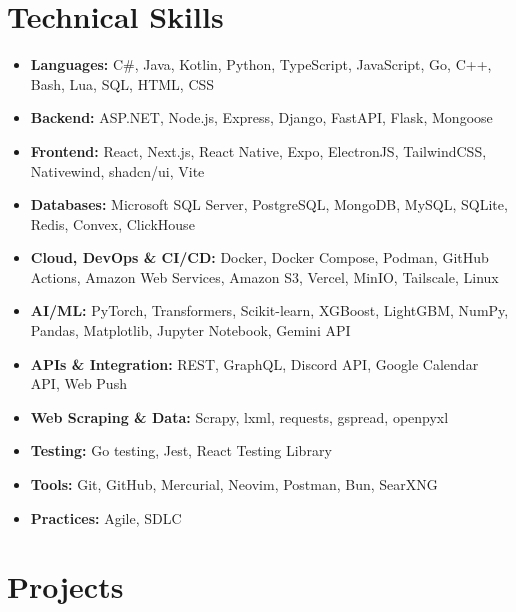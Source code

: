 \documentclass[a4paper,11pt]{article}
\begin{document}
\section*{Technical Skills}
\begin{itemize}
\item \textbf{Languages:} C\#, Java, Kotlin, Python, TypeScript, JavaScript, Go, C++, Bash, Lua, SQL, HTML, CSS
\item \textbf{Backend:} ASP.NET, Node.js, Express, Django, FastAPI, Flask, Mongoose
\item \textbf{Frontend:} React, Next.js, React Native, Expo, ElectronJS, TailwindCSS, Nativewind, shadcn/ui, Vite
\item \textbf{Databases:} Microsoft SQL Server, PostgreSQL, MongoDB, MySQL, SQLite, Redis, Convex, ClickHouse
\item \textbf{Cloud, DevOps \& CI/CD:} Docker, Docker Compose, Podman, GitHub Actions, Amazon Web Services, Amazon S3, Vercel, MinIO, Tailscale, Linux
\item \textbf{AI/ML:} PyTorch, Transformers, Scikit-learn, XGBoost, LightGBM, NumPy, Pandas, Matplotlib, Jupyter Notebook, Gemini API
\item \textbf{APIs \& Integration:} REST, GraphQL, Discord API, Google Calendar API, Web Push
\item \textbf{Web Scraping \& Data:} Scrapy, lxml, requests, gspread, openpyxl
\item \textbf{Testing:} Go testing, Jest, React Testing Library
\item \textbf{Tools:} Git, GitHub, Mercurial, Neovim, Postman, Bun, SearXNG
\item \textbf{Practices:} Agile, SDLC
\end{itemize}


\section*{Projects}
\end{document}
